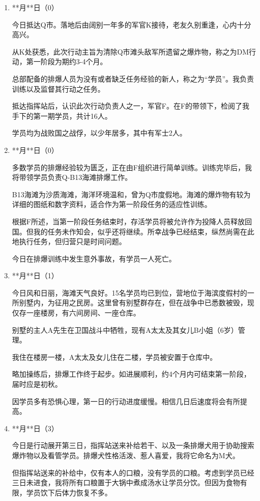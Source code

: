 \begin{enumerate}
    \item **月**日（0）
    
今日抵达Q市。落地后由阔别一年多的军官K接待，老友久别重逢，心内十分高兴。

从K处获悉，此次行动主旨为清除Q市滩头敌军所遗留之爆炸物，称之为DM行动，第一阶段为期约3-4个月。

总部配备的排爆人员为没有或者缺乏任务经验的新人，称之为“学员”。我负责训练以及监督其行动之任务。

抵达指挥站后，认识此次行动负责人之一，军官F。在F的带领下，检阅了我手下的第一期学员，共计16人。

学员均为战败国之战俘，以少年居多，其中有军士2人。
    \item **月**日（0）
    
多数学员的排爆经验较为匮乏，正在由F组织进行简单训练。训练完毕后，我将带领学员负责Q-B13海滩排爆工作。

B13海滩为沙质海滩，海洋环境温和，曾为Q市度假地。海滩的爆炸物有较为详细的图纸和数字资料，适合作为第一阶段任务的适应性训练。

根据F所述，当第一阶段任务结束时，存活学员将被允许作为投降人员释放回国。但我的任务未作知会，似乎还将继续。所幸战争已经结束，纵然尚需在此地执行任务，但归营只是时间问题。

今日在排爆训练中发生意外事故，有学员一人死亡。
    \item **月**日（1）
    
今日风和日丽，海滩天气良好。15名学员均已到位，营地位于海滨度假村的一所别墅内，为征用之民房。这里曾有别墅群存在，但在战争中已悉数被毁，现仅存一座楼房，有六间房间、一座仓库。

别墅的主人A先生在卫国战斗中牺牲，现有A太太及其女儿B小姐（6岁）管理。

我住在楼房一楼，A太太及女儿住在二楼，学员被安置于仓库中。

略加操练后，排爆工作终于起步。如进展顺利，约4个月内可结束第一阶段，届时应是初秋。

因学员多有恐惧心理，第一日的行动进度缓慢。相信几日后速度将会有所提高。
    \item **月**日（3）
    
今日是行动展开第三日，指挥站送来补给若干、以及一条排爆犬用于协助搜索爆炸物以及看管学员。排爆犬性格活泼、惹人喜爱，我将它命名为M犬。

但指挥站送来的补给中，仅有本人的口粮，没有学员的口粮。考虑到学员已经三日未进食，我将所有口粮置于大锅中煮成汤水让学员分饮。但因为食物有限，学员饮下后体力恢复不多。


\end{enumerate}
